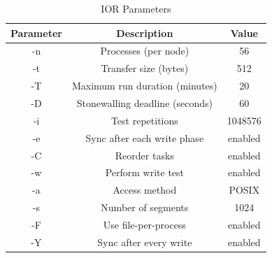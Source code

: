 \begin{table}[htbp]
\caption{IOR Parameters}
\begin{center}
\begin{tabular}{|c|c|c|}
  \hline
  \textbf{Parameter} & \textbf{Description} & \textbf{Value} \\
  \hline
      [srun] -n & Processes (per node) & 56 \\
      -t & Transfer size (bytes) & 512 \\
      -T & Maximum run duration (minutes) & 20 \\
      -D & Stonewalling deadline (seconds) & 60 \\
      -i & Test repetitions & 1048576 \\
      -e & Sync after each write phase & enabled \\
      -C & Reorder tasks & enabled \\
      -w & Perform write test & enabled \\
      -a & Access method & POSIX \\
      -s & Number of segments & 1024 \\
      -F & Use file-per-process & enabled \\
      -Y & Sync after every write & enabled \\      
\hline
\end{tabular}
\label{tab:ior-params}
\end{center}
\end{table}




